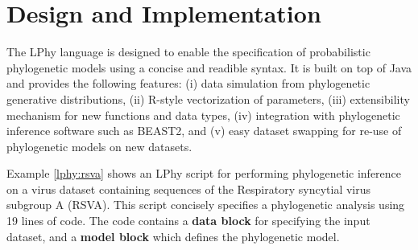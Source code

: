 \documentclass[10pt,letterpaper,table]{article}
\begin{document}
\section*{Design and Implementation}

The LPhy language is designed to enable the specification of probabilistic phylogenetic models using a concise and readible syntax. 
It is built on top of Java and provides the following features: 
(i) data simulation from phylogenetic generative distributions, (ii) R-style vectorization of parameters, (iii) extensibility mechanism for new functions and data types, (iv) integration with phylogenetic inference software such as BEAST2, and (v) easy dataset swapping for re-use of phylogenetic models on new datasets.

Example \ref{lphy:rsva} shows an LPhy script for performing phylogenetic inference on a virus dataset containing sequences of the Respiratory syncytial virus subgroup A (RSVA). 
This script concisely specifies a phylogenetic analysis using 19 lines of code.  
The code contains a \textbf{data block} for specifying the input dataset, and a \textbf{model block} which defines the phylogenetic model. 
\end{document}
